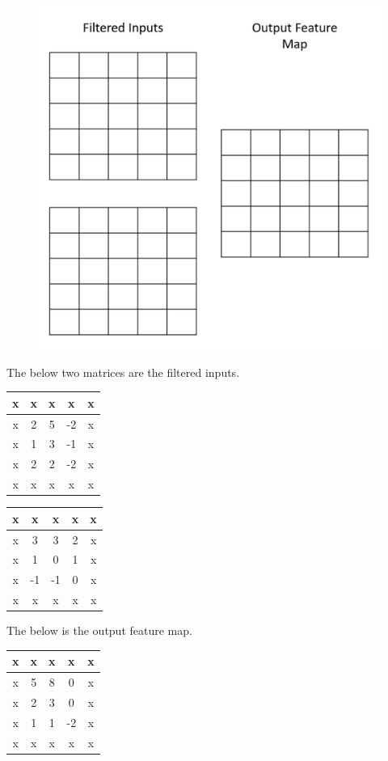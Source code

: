 \begin{figure}[H]
	\centering
	\includegraphics[width=.35\linewidth]{images/conv_question_blanks_1.png}
\end{figure}

\begin{tcolorbox}[title=Solution]
	The below two matrices are the filtered inputs.
	\begin{center}
		\begin{tabular}{|c|c|c|c|c|}
			\hline
			x & x & x & x & x \\ \hline
			x & 2 & 5 & -2 & x \\ \hline
			x & 1 & 3 & -1 & x \\ \hline
			x & 2 & 2 & -2 & x \\ \hline
			x & x & x  & x & x \\ \hline
		\end{tabular}
	\end{center}
	\begin{center}
		\begin{tabular}{|c|c|c|c|c|}
			\hline
			x  & x  & x & x & x \\ \hline
			x  & 3  & 3 & 2 & x \\ \hline
			x  & 1  & 0 & 1 & x \\ \hline
			x  & -1 & -1 & 0 & x \\ \hline
			x  & x  & x & x & x \\ \hline
		\end{tabular}
	\end{center}
	The below is the output feature map.
	\begin{center}
		\begin{tabular}{|c|c|c|c|c|}
			\hline
			x & x & x  & x & x \\ \hline
			x & 5 & 8  & 0 & x \\ \hline
			x & 2 & 3 & 0 & x \\ \hline
			x & 1 & 1  & -2 & x \\ \hline
			x & x & x  & x & x \\ \hline
		\end{tabular}
	\end{center}
\end{tcolorbox}
